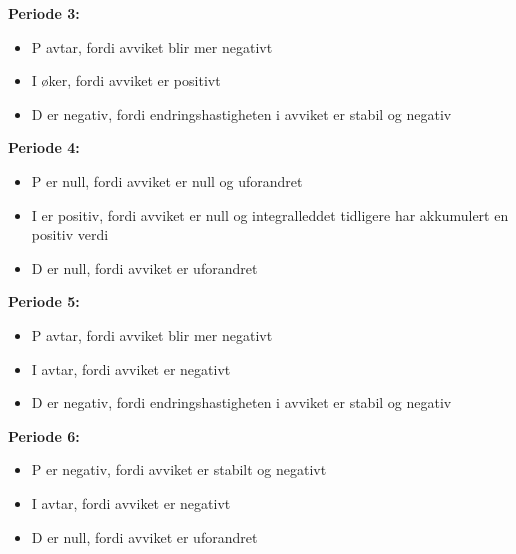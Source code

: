 {\bf Periode 3:}

\begin{itemize}
\item{}P avtar, fordi avviket blir mer negativt
\item{}I øker, fordi avviket er positivt
\item{}D er negativ, fordi endringshastigheten i avviket er stabil og negativ
\end{itemize}
\bigskip



{\bf Periode 4:}

\begin{itemize}
\item{}P er null, fordi avviket er null og uforandret
\item{}I er positiv, fordi avviket er null og integralleddet tidligere har akkumulert en positiv verdi
\item{}D er null, fordi avviket er uforandret
\end{itemize}
\bigskip



{\bf Periode 5:}

\begin{itemize}
\item{}P avtar, fordi avviket blir mer negativt
\item{}I avtar, fordi avviket er negativt
\item{}D er negativ, fordi endringshastigheten i avviket er stabil og negativ
\end{itemize}
\bigskip



{\bf Periode 6:}

\begin{itemize}
\item{}P er negativ, fordi avviket er stabilt og negativt
\item{}I avtar, fordi avviket er negativt
\item{}D er null, fordi avviket er uforandret
\end{itemize}




